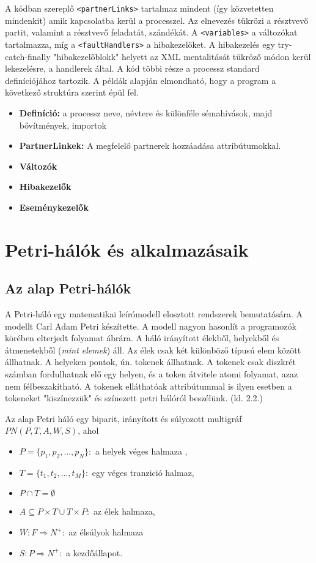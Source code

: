 \documentclass[12pt,a4paper]{book}
\begin{document}
 A kódban szereplő \texttt{<partnerLinks>} tartalmaz mindent (így közvetetten mindenkit) amik kapcsolatba kerül a processzel. Az elnevezés tükrözi a résztvevő partit, valamint a résztvevő feladatát, szándékát. A \texttt{<variables>} a változókat tartalmazza, míg a \texttt{<faultHandlers>} a hibakezelőket. A hibakezelés egy try-catch-finally "hibakezelőblokk" helyett az XML mentalitását tükröző módon kerül lekezelésre, a handlerek által. A kód többi része a processz standard definíciójához tartozik. A példák alapján elmondható, hogy a program a következő struktúra szerint épül fel.
\begin{itemize}
\item \textbf{Definíció: } a processz neve, névtere és különféle sémahívások, majd bővítmények, importok
\item \textbf{PartnerLinkek: } A megfelelő partnerek hozzáadása attribútumokkal. 
\item \textbf{Változók}
\item \textbf{Hibakezelők}
\item\textbf{Eseménykezelők}
\end{itemize}

\chapter{Petri-hálók és alkalmazásaik}
\section{Az alap Petri-hálók}
A Petri-háló egy matematikai leírómodell elosztott rendszerek bemutatására.
A modellt Carl Adam Petri készítette.
A modell nagyon hasonlít a programozók körében elterjedt folyamat ábrára.
A háló irányított élekből, helyekből és átmenetekből (\textsl{mint elemek}) áll.
Az élek csak két különböző típusú elem között állhatnak.
A helyeken pontok, ún. tokenek állhatnak.
A tokenek csak diszkrét számban fordulhatnak elő egy helyen, és a token átvitele atomi folyamat, azaz nem félbeszakítható.
A tokenek elláthatóak attribútummal is ilyen esetben a tokeneket "kiszínezzük" és színezett petri hálóról beszélünk. (ld. 2.2.) %

Az alap Petri háló egy biparit, irányított és súlyozott multigráf $PN(P,T,A,W,S)$, ahol 
\begin{itemize}
\item $P=\{ p_1,p_2,\ldots ,p_N \}:$ a helyek véges halmaza ,
\item $T=\{ t_1,t_2,\ldots ,t_M\}:$ egy véges tranzició halmaz,
\item $P\cap T = \emptyset$
\item $A \subseteq P\times T \cup T\times P:$ az élek halmaza,
\item $W: F\Rightarrow N^+:$ az élsúlyok halmaza
\item $S: P\Rightarrow N^+:$ a kezdőállapot.
\end{itemize}
\end{document}

